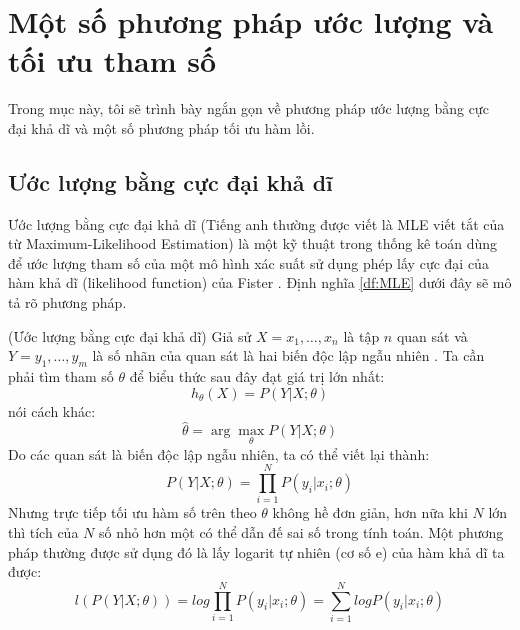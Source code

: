 \section{Một số phương pháp ước lượng và tối ưu tham số}
Trong mục này, tôi sẽ trình bày ngắn gọn về phương pháp ước lượng bằng cực đại khả dĩ và một số phương pháp tối ưu hàm lồi.
\subsection{Ước lượng bằng cực đại khả dĩ}
Ước lượng bằng cực đại khả dĩ (Tiếng anh thường được viết là MLE viết tắt của từ Maximum-Likelihood Estimation) là một kỹ thuật trong thống kê toán dùng để ước lượng tham số của một mô hình xác suất sử dụng phép lấy cực đại của hàm khả dĩ (likelihood function) của Fister \cite{aldrich1997ra}. Định nghĩa \ref{df:MLE} dưới đây sẽ mô tả rõ phương pháp.
\begin{definition}(Ước lượng bằng cực đại khả dĩ)\label{df:MLE}
	Giả sử $X = {x_1,\dots,x_n}$ là tập $n$ quan sát và $Y={y_1,\dots,y_m}$ là số nhãn của quan sát là hai biến độc lập ngẫu nhiên . Ta cần phải tìm tham số $\theta$ để biểu thức sau đây đạt giá trị lớn nhất:
	\begin{equation}
		h_{\theta}{(X)} = P(Y|X;\theta)
	\end{equation}
	nói cách khác:
	\begin{equation}
	\hat{\theta} = \arg \max_{\theta}{P(Y|X;\theta)}
	\end{equation}
	Do các quan sát là biến độc lập ngẫu nhiên, ta có thể viết lại thành:
	\begin{equation}
	P(Y|X;\theta)= \prod_{i=1}^N P(y_i|x_i;\theta)
	\end{equation}
	Nhưng trực tiếp tối ưu hàm số trên theo $\theta$ không hề đơn giản, hơn nữa khi $N$ lớn thì tích của $N$ số nhỏ hơn một có thể dẫn đế sai số trong tính toán. Một phương pháp thường được sử dụng đó là lấy logarit tự nhiên (cơ số e) của hàm khả dĩ ta được:
	\begin{equation}
	l(P(Y|X;\theta))= log{\prod_{i=1}^N{P(y_i|x_i;\theta)}} = \sum_{i=1}^N{log{P(y_i|x_i;\theta)}}
	\end{equation}
\end{definition}

